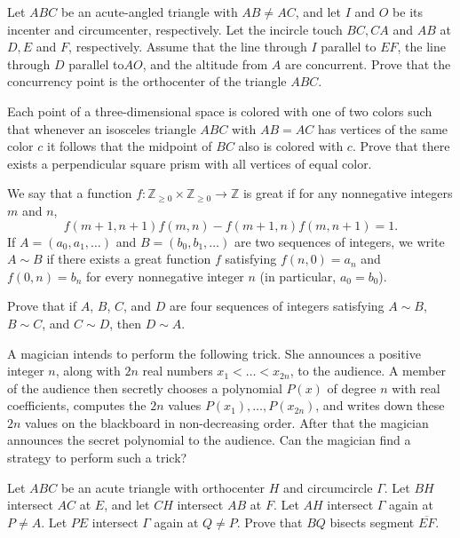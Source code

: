 \documentclass[11pt]{scrartcl}
\begin{document}
\begin{problem}[318208660266829737]
Let $ABC$ be an acute-angled triangle with $AB \ne AC$, and let $I$ and $O$ be its incenter and circumcenter, respectively. Let the incircle touch $BC, CA$ and $AB$ at $D, E$ and $F$, respectively. Assume that the line through $I$ parallel to $EF$, the line through $D$ parallel to$ AO$, and the altitude from $A$ are concurrent. Prove that the concurrency point is the orthocenter of the triangle $ABC$.
\end{problem}
\begin{problem}[302701281403387]
  Each point of a three-dimensional space is colored
  with one of two colors such that
  whenever an isosceles triangle $ABC$ with $AB = AC$
  has vertices of the same color $c$ it follows that
  the midpoint of $BC$ also is colored with $c$.
  Prove that there exists a perpendicular square prism
  with all vertices of equal color.
\end{problem}
\begin{problem}[2667130530962382147]
	We say that a function $f: \mathbb{Z}_{\ge 0} \times \mathbb{Z}_{\ge 0} \to \mathbb{Z}$ is great if for any nonnegative integers $m$ and $n$,
\[f(m + 1, n + 1) f(m, n) - f(m + 1, n) f(m, n + 1) = 1.\]If $A = (a_0, a_1, \dots)$ and $B = (b_0, b_1, \dots)$ are two sequences of integers, we write $A \sim B$ if there exists a great function $f$ satisfying $f(n, 0) = a_n$ and $f(0, n) = b_n$ for every nonnegative integer $n$ (in particular, $a_0 = b_0$).

Prove that if $A$, $B$, $C$, and $D$ are four sequences of integers satisfying $A \sim B$, $B \sim C$, and $C \sim D$, then $D \sim A$.
\end{problem}
\begin{problem}[448881061747528]
A magician intends to perform the following trick. She announces a positive integer $n$, along with $2n$ real numbers $x_1 < \dots < x_{2n}$, to the audience. A member of the audience then secretly chooses a polynomial $P(x)$ of degree $n$ with real coefficients, computes the $2n$ values $P(x_1), \dots , P(x_{2n})$, and writes down these $2n$ values on the blackboard in non-decreasing order. After that the magician announces the secret polynomial to the audience. Can the magician find a strategy to perform such a trick?
\end{problem}
\begin{problem}[8528437132500966626]
	Let $ABC$ be an acute triangle with orthocenter $H$ and circumcircle $\Gamma$. Let $BH$ intersect $AC$ at $E$, and let $CH$ intersect $AB$ at $F$. Let $AH$ intersect $\Gamma$ again at $P \neq A$. Let $PE$ intersect $\Gamma$ again at $Q \neq P$. Prove that $BQ$ bisects segment $\overline{EF}$.
\end{problem}
\end{document}
